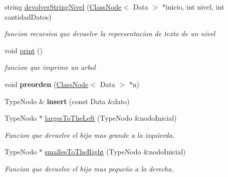 \begin{DoxyCompactItemize}
string \hyperlink{class_binary_search_tree_a30a79ed298da4d6fe4395dddd53842b8}{devolver\+String\+Nivel} (\hyperlink{class_class_node}{Class\+Node}$<$ Data $>$ $\ast$inicio, int nivel, int cantidad\+Datos)
\begin{DoxyCompactList}\small\item\em funcion recursiva que devuelve la representacion de texto de un nivel \end{DoxyCompactList}\item 
\mbox{\label{class_binary_search_tree_af6e24d171e86e3c3a9092dbb822e4411}} 
void \hyperlink{class_binary_search_tree_af6e24d171e86e3c3a9092dbb822e4411}{print} ()
\begin{DoxyCompactList}\small\item\em funcion que imprime un arbol \end{DoxyCompactList}\item 
\mbox{\label{class_binary_search_tree_ad1ef774f107b357863b1b578d0723553}} 
void {\bfseries preorden} (\hyperlink{class_class_node}{Class\+Node}$<$ Data $>$ $\ast$n)
\item 
\mbox{\label{class_binary_search_tree_adfac6a810d0b81e6772c63808684c8b2}} 
Type\+Nodo \& {\bfseries insert} (const Data \&dato)
\item 
\mbox{\label{class_binary_search_tree_af1b0c6778ed2f1a57d598ef33358b6d9}} 
Type\+Nodo $\ast$ \hyperlink{class_binary_search_tree_af1b0c6778ed2f1a57d598ef33358b6d9}{larges\+To\+The\+Left} (Type\+Nodo \&nodo\+Inicial)
\begin{DoxyCompactList}\small\item\em Funcion que devuelve el hijo mas grande a la izquierda. \end{DoxyCompactList}\item 
\mbox{\label{class_binary_search_tree_a0f845aaaa83043d56c187117e5829b9b}} 
Type\+Nodo $\ast$ \hyperlink{class_binary_search_tree_a0f845aaaa83043d56c187117e5829b9b}{smalles\+To\+The\+Right} (Type\+Nodo \&nodo\+Inicial)
\begin{DoxyCompactList}\small\item\em Funcion que devuelve el hijo mas pequeño a la derecha. \end{DoxyCompactList}\item 

\end{DoxyCompactItemize}
